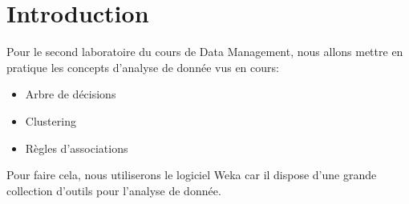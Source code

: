 \chapter*{Introduction}

Pour le second laboratoire du cours de Data Management, nous allons mettre en pratique les concepts d'analyse de donnée vus en cours:

\begin{itemize}
	\item Arbre de décisions
	\item Clustering
	\item Règles d'associations
\end{itemize}

Pour faire cela, nous utiliserons le logiciel Weka car il dispose d'une grande collection d'outils pour l'analyse de donnée.

